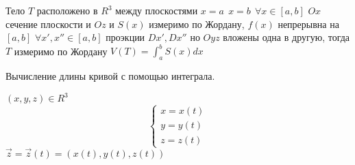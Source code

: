 \begin{theorem}
  Тело $T$ расположено в $R^3$ между плоскостями $x = a ~~ x = b ~~
  \forall x \in [a,b]$ $Ox$ сечение плоскости и $Oz$ и $S(x)$ измеримо по
  Жордану, $f(x)$ непрерывна на $[a,b]$ $\forall x', x'' \in [a,b]$ проэкции
  $Dx', Dx''$ но $Oyz$ вложены одна в другую, тогда $T$ измеримо по Жордану
  $V(T) = \int_a^b S(x) dx$
\end{theorem}

\begin{title}[\Large]
  Вычисление длины кривой с помощью интеграла.
\end{title}

\begin{defin}[кривой]
  $(x,y,z) \in R^3$
  $$
    \left\{
      \begin{array}{l}
        x = x(t) \\
        y = y(t) \\
        z = z(t)
      \end{array}
    \right.
  $$
  $\vec z = \vec z (t) = ( x(t), y(t) , z(t) )$
\end{defin}

